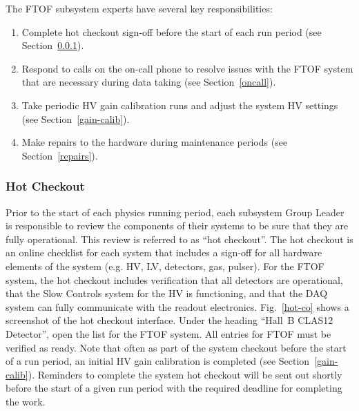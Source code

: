 \documentclass[12pt]{article}
\begin{document}
The FTOF subsystem experts have several key responsibilities:

\begin{enumerate}
\item Complete hot checkout sign-off before the start of each run period (see Section~\ref{checkout}).
\item Respond to calls on the on-call phone to resolve issues with the FTOF system that are necessary 
during data taking (see Section~\ref{oncall}).
\item Take periodic HV gain calibration runs and adjust the system HV settings (see 
Section~\ref{gain-calib}).
\item Make repairs to the hardware during maintenance periods (see Section~\ref{repairs}).
\end{enumerate}

\subsubsection{Hot Checkout}
\label{checkout}

Prior to the start of each physics running period, each subsystem Group Leader is responsible to
review the components of their systems to be sure that they are fully operational. This review is
referred to as ``hot checkout''. The hot checkout is an online checklist for each system that
includes a sign-off for all hardware elements of the system (e.g. HV, LV, detectors, gas, pulser).
For the FTOF system, the hot checkout includes verification that all detectors are operational,
that the Slow Controls system for the HV is functioning, and that the DAQ system can fully
communicate with the readout electronics. Fig.~\ref{hot-co} shows a screenshot of the hot checkout 
interface. Under the heading ``Hall~B CLAS12 Detector'', open the list for the FTOF system. All 
entries for FTOF must be verified as ready. Note that often as part of the system checkout before 
the start of a run period, an initial HV gain calibration is completed (see Section~\ref{gain-calib}). 
Reminders to complete the system hot checkout will be sent out shortly before the start of a given 
run period with the required deadline for completing the work.
\end{document}
